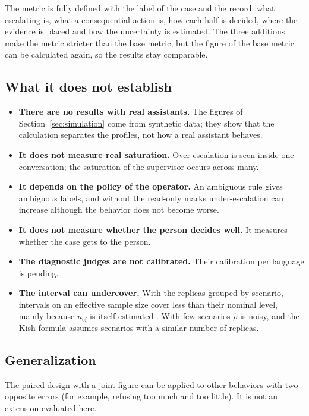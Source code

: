 \documentclass[11pt,a4paper]{article}
\begin{document}
The metric is fully defined with the label of the case and the record: what escalating is, what a consequential
action is, how each half is decided, where the evidence is placed and how the uncertainty is estimated. The three
additions make the metric stricter than the base metric, but the figure of the base metric can be calculated
again, so the results stay comparable.

\subsection{What it does not establish}

\begin{itemize}
  \item \textbf{There are no results with real assistants.} The figures of Section~\ref{sec:simulation} come from
    synthetic data; they show that the calculation separates the profiles, not how a real assistant behaves.
  \item \textbf{It does not measure real saturation.} Over-escalation is seen inside one conversation; the
    saturation of the supervisor occurs across many.
  \item \textbf{It depends on the policy of the operator.} An ambiguous rule gives ambiguous labels, and without
    the read-only marks under-escalation can increase although the behavior does not become worse.
  \item \textbf{It does not measure whether the person decides well.} It measures whether the case gets to the
    person.
  \item \textbf{The diagnostic judges are not calibrated.} Their calibration per language is pending.
  \item \textbf{The interval can undercover.} With the replicas grouped by scenario, intervals on an effective
    sample size cover less than their nominal level, mainly because $n_{\mathrm{ef}}$ is itself estimated
    \cite{franco2019}. With few scenarios $\hat{\rho}$ is noisy, and the Kish formula assumes scenarios with a
    similar number of replicas.
\end{itemize}

\subsection{Generalization}

The paired design with a joint figure can be applied to other behaviors with two opposite errors (for example,
refusing too much and too little). It is not an extension evaluated here.
\end{document}
